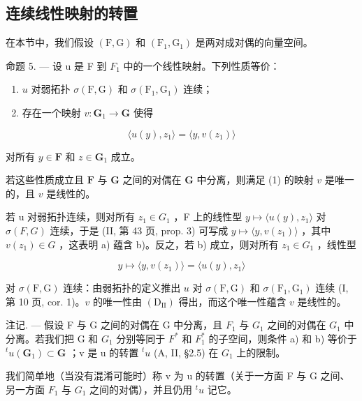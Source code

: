 \subsection{连续线性映射的转置}

在本节中，我们假设 \((\mathrm{F},\mathrm{G})\) 和 \((\mathrm{F}_1,\mathrm{G}_1)\) 是两对成对偶的向量空间。

命题 5. --- 设 u 是 F 到 \(F_{1}\) 中的一个线性映射。下列性质等价：

\begin{enumerate}
\def\labelenumi{\alph{enumi})}
\item
  \(u\) 对弱拓扑 \(\sigma (\mathrm{F},\mathrm{G})\) 和 \(\sigma (\mathrm{F}_1,\mathrm{G}_1)\) 连续；
\item
  存在一个映射 \(v: \mathbf{G}_1 \to \mathbf{G}\) 使得
\end{enumerate}

\[
\langle u (y), z _ {1} \rangle = \langle y, v (z _ {1}) \rangle\tag{1}
\]

对所有 \(y \in \mathbf{F}\) 和 \(z \in \mathbf{G}_1\) 成立。

若这些性质成立且 \(\mathbf{F}\) 与 \(\mathbf{G}\) 之间的对偶在 \(\mathbf{G}\) 中分离，则满足 (1) 的映射 \(v\) 是唯一的，且 \(v\) 是线性的。

若 u 对弱拓扑连续，则对所有 \(z_{1} \in G_{1}\) ，F 上的线性型 \(y \mapsto \langle u(y), z_{1} \rangle\) 对 \(\sigma(F, G)\) 连续，于是 (II, 第 43 页, prop. 3) 可写成 \(y \mapsto \langle y, v(z_{1}) \rangle\) ，其中 \(v(z_{1}) \in G\) ，这表明 a) 蕴含 b)。反之，若 b) 成立，则对所有 \(z_{1} \in G_{1}\) ，线性型

\[
y \mapsto \langle y, v (z _ {1}) \rangle = \langle u (y), z _ {1} \rangle
\]

对 \(\sigma(\mathrm{F},\mathrm{G})\) 连续：由弱拓扑的定义推出 \(u\) 对 \(\sigma(\mathrm{F},\mathrm{G})\) 和 \(\sigma(\mathrm{F}_1,\mathrm{G}_1)\) 连续 (I, 第 10 页, cor. 1)。\(v\) 的唯一性由 \((\mathrm{D}_{\mathrm{II}})\) 得出，而这个唯一性蕴含 \(v\) 是线性的。

注记. --- 假设 F 与 G 之间的对偶在 G 中分离，且 \(F_{1}\) 与 \(G_{1}\) 之间的对偶在 \(G_{1}\) 中分离。若我们把 G 和 \(G_{1}\) 分别等同于 \(F^{*}\) 和 \(F_{1}^{*}\) 的子空间，则条件 a) 和 b) 等价于 \(^{t}u(\mathbf{G}_{1}) \subset \mathbf{G}\) ；v 是 u 的转置 \(^{t}u\) (A, II, §2.5) 在 \(G_{1}\) 上的限制。

我们简单地（当没有混淆可能时）称 v 为 u 的转置（关于一方面 F 与 G 之间、另一方面 \(F_{1}\) 与 \(G_{1}\) 之间的对偶），并且仍用 \(^{t}u\) 记它。

